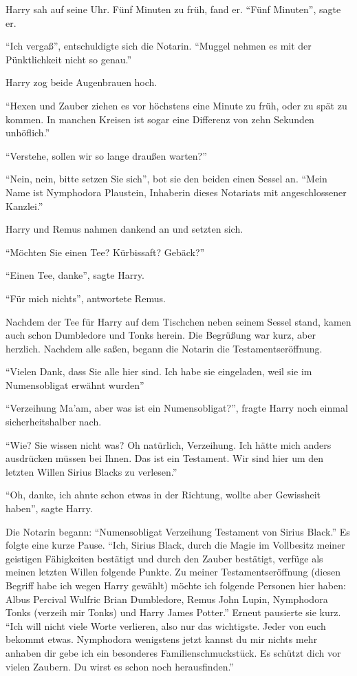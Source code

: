 Harry sah auf seine Uhr. Fünf Minuten zu früh, fand er. \enquote{Fünf Minuten}, sagte er.

\enquote{Ich vergaß}, entschuldigte sich die Notarin. \enquote{Muggel nehmen es mit der Pünktlichkeit nicht so genau.}

Harry zog beide Augenbrauen hoch.

\enquote{Hexen und Zauber ziehen es vor höchstens eine Minute zu früh, oder zu spät zu kommen. In manchen Kreisen ist sogar eine Differenz von zehn Sekunden unhöflich.}

\enquote{Verstehe, sollen wir so lange draußen warten?}

\enquote{Nein, nein, bitte \gst setzen Sie sich}, bot sie den beiden einen Sessel an. \enquote{Mein Name ist Nymphodora Plaustein, Inhaberin dieses Notariats mit angeschlossener Kanzlei.}

Harry und Remus nahmen dankend an und setzten sich.

\enquote{Möchten Sie einen Tee? Kürbissaft? Gebäck?}

\enquote{Einen Tee, danke}, sagte Harry.

\enquote{Für mich nichts}, antwortete Remus.

Nachdem der Tee für Harry auf dem Tischchen neben seinem Sessel stand, kamen auch schon Dumbledore und Tonks herein. Die Begrüßung war kurz, aber herzlich. Nachdem alle saßen, begann die Notarin die Testamentseröffnung.

\enquote{Vielen Dank, dass Sie alle hier sind. Ich habe sie eingeladen, weil sie im Numensobligat erwähnt wurden\abs}

\enquote{Verzeihung Ma’am, aber was ist ein Numensobligat?}, fragte Harry noch einmal sicherheitshalber nach.

\enquote{Wie? Sie wissen nicht was\abs? Oh natürlich, Verzeihung. Ich hätte mich anders ausdrücken müssen bei Ihnen. Das ist ein Testament. Wir sind hier um den letzten Willen Sirius Blacks zu verlesen.}

\enquote{Oh, danke, ich ahnte schon etwas in der Richtung, wollte aber Gewissheit haben}, sagte Harry.

Die Notarin begann: \enquote{Numensobligat \gst Verzeihung \gst Testament von Sirius Black.} Es folgte eine kurze Pause. \enquote{Ich, Sirius Black, durch die Magie im Vollbesitz meiner geistigen Fähigkeiten bestätigt und durch den Zauber bestätigt, verfüge als meinen letzten Willen folgende Punkte. Zu meiner Testamentseröffnung (diesen Begriff habe ich wegen Harry gewählt) möchte ich folgende Personen hier haben: Albus Percival Wulfric Brian Dumbledore, Remus John Lupin, Nymphodora Tonks (verzeih mir Tonks) und Harry James Potter.} Erneut pausierte sie kurz. \enquote{Ich will nicht viele Worte verlieren, also nur das wichtigste. Jeder von euch bekommt etwas. Nymphodora \gst wenigstens jetzt kannst du mir nichts mehr anhaben \gst dir gebe ich ein besonderes Familienschmuckstück. Es schützt dich vor vielen Zaubern. Du wirst es schon noch herausfinden.}

